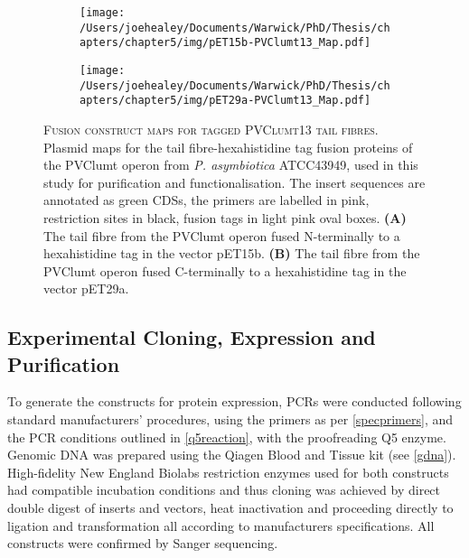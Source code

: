 \begin{figure}[p]

\centering
    \begin{subfigure}{\textwidth}
        \centering
        \texttt{[image: /Users/joehealey/Documents/Warwick/PhD/Thesis/chapters/chapter5/img/pET15b-PVClumt13\_Map.pdf]}
        \captionsetup{singlelinecheck=off, justification=centering, font=footnotesize, aboveskip=10pt}
        \caption{}
        \label{pET15lumt}
    \end{subfigure}%
    
    \vspace{0.5cm}
    
    \begin{subfigure}{\textwidth}
        \centering
            \texttt{[image: /Users/joehealey/Documents/Warwick/PhD/Thesis/chapters/chapter5/img/pET29a-PVClumt13\_Map.pdf]}
            \captionsetup{singlelinecheck=off, justification=centering, font=footnotesize, aboveskip=10pt}
            \caption{}
            \label{pET29lumt}
        \end{subfigure}%
	\captionsetup{singlelinecheck=off, justification=justified, font=footnotesize, aboveskip=10pt}
	\caption[Plasmid maps for cloned PVClumt tail fibre proteins]{\textsc{\normalsize Fusion construct maps for tagged PVClumt13 tail fibres.}\vspace{0.1cm} \newline Plasmid maps for the tail fibre-hexahistidine tag fusion proteins of the PVClumt operon from \emph{P. asymbiotica} ATCC43949, used in this study for purification and functionalisation. The insert sequences are annotated as green CDSs, the primers are labelled in pink, restriction sites in black, fusion tags in light pink oval boxes. \textbf{(A)} The tail fibre from the PVClumt operon fused N-terminally to a hexahistidine tag in the vector pET15b. \textbf{(B)} The tail fibre from the PVClumt operon fused C-terminally to a hexahistidine tag in the vector pET29a.}
	\label{tailfibreplasmidslumt}
\end{figure}
\clearpage




\subsection{Experimental Cloning, Expression and Purification}
To generate the constructs for protein expression, PCRs were conducted following standard manufacturers' procedures, using the primers as per \vref{specprimers}, and the PCR conditions outlined in \vref{q5reaction}, with the proofreading Q5 enzyme. Genomic DNA was prepared using the Qiagen Blood and Tissue kit (see \vref{gdna}). High-fidelity New England Biolabs restriction enzymes used for both constructs had compatible incubation conditions and thus cloning was achieved by direct double digest of inserts and vectors, heat inactivation and proceeding directly to ligation and transformation all according to manufacturers specifications. All constructs were confirmed by Sanger sequencing.


